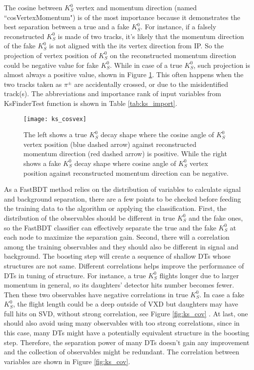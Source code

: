 The cosine between $K_S^0$ vertex and momentum direction (named ``cosVertexMomentum") is of the most importance because it demonstrates the best separation between a true and a fake $K_S^0$. For instance, if a falsely reconstructed $K_S^0$ is made of two tracks, it's likely that the momentum direction of the fake $K_S^0$ is not aligned with the its vertex direction from IP. So the projection of vertex position of $K_S^0$ on the reconstructed momentum direction could be negative value for fake $K_S^0$. While in case of a true $K_S^0$, such projection is almost always a positive value, shown in Figure \ref{fig:ks_cosvex}. This often happens when the two tracks taken as $\pi^{\pm}$ are accidentally crossed, or due to the misidentified track(s). The abbreviations and importance rank of input variables from KsFinderTest function is shown in Table 
\ref{tab:ks_import}.

\begin{figure}[htbp]
	\centering
	\texttt{[image: ks\_cosvex]}
	\caption{The left shows a true $K_S^0$ decay shape where the cosine angle of $K_S^0$ vertex position (blue dashed arrow) against reconstructed momentum direction (red dashed arrow) is positive. While the right shows a fake $K_S^0$ decay shape where cosine angle of $K_S^0$ vertex position against reconstructed momentum direction can be negative. }
	\label{fig:ks_cosvex}
\end{figure}
 
As a FastBDT method relies on the distribution of variables to calculate signal and background separation, there are a few points to be checked before feeding the training data to the algorithm or applying the classification. First, the distribution of the observables should be different in true $K_S^0$ and the fake ones, so the FastBDT classifier can effectively separate the true and the fake $K_S^0$ at each node to maximize the separation gain. Second, there will a correlation among the training observables and they should also be different in signal and background. The boosting step will create a sequence of shallow DTs whose structures are not same. Different correlations helps improve the performance of DTs in tuning of structure. For instance, a true $K_S^0$ flights longer due to larger momentum in general, so its daughters' detector hits number becomes fewer. Then these two observables have negative correlations in true $K_S^0$. In case a fake $K_S^0$, the flight length could be a deep outside of VXD  but daughters may have full hits on SVD, without strong correlation, see Figure  \ref{fig:ks_cov} . At last, one should also avoid using many observables with too strong correlations, since in this case, many DTs might have a potentially equivalent structure in the boosting step. Therefore, the separation power of many DTs doesn't gain any improvement and the collection of observables might be redundant. The correlation between variables are shown in Figure \ref{fig:ks_cov}.

